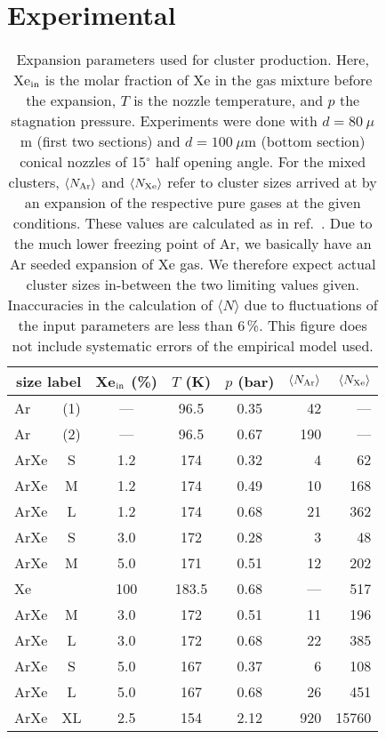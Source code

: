 \section{Experimental}
%
\begin{table*}
\caption{
Expansion parameters used for cluster production. Here, Xe$_{\rm in}$ is the molar fraction of Xe in the gas mixture before the expansion, $T$ is the nozzle temperature, and $p$ the stagnation pressure. Experiments were done with $d = 80~\mu$m (first two sections) and $d = 100~\mu$m (bottom section) conical nozzles of 15$^\circ$ half opening angle. For the mixed clusters, $\langle N_{\rm Ar} \rangle$ and $\langle N_{\rm Xe} \rangle$ refer to cluster sizes arrived at by an expansion of the respective pure gases at the given conditions. These values are calculated as in ref.\ \protect{}. Due to the much lower freezing point of Ar, we basically have an Ar seeded expansion of Xe gas. We therefore expect actual cluster sizes in-between the two limiting values given. Inaccuracies in the calculation of $\langle N\rangle$ due to fluctuations of the input parameters are less than 6\,\%. This figure does not include systematic errors of the empirical model used.
}
\label{tab:cluster}

\begin{tabular}{l c c c c r r}
%
\toprule
  \multicolumn{2}{r}{size label}  &  Xe$_{\rm in}$ (\%)  &  $T$ (K)  &  $p$ (bar) & $\langle N_{\rm Ar} \rangle$ & $\langle N_{\rm Xe} \rangle$ \\
%
\midrule
Ar & (1) & --- &  96.5  & 0.35  &  42  &  --- \\
Ar & (2) & --- &  96.5  & 0.67  & 190  &  --- \\
ArXe & S & 1.2 &  174   & 0.32  &   4  &   62 \\
ArXe & M & 1.2 &  174   & 0.49  &  10  &  168 \\
ArXe & L & 1.2 &  174   & 0.68  &  21  &  362 \\
ArXe & S & 3.0 &  172   & 0.28  &   3  &   48 \\
ArXe & M & 5.0 &  171   & 0.51  &  12  &  202 \\
Xe &  & 100 & 183.5  & 0.68  & ---  &  517 \\     
\midrule
ArXe & M & 3.0 &  172   & 0.51  &  11  &  196 \\
ArXe & L & 3.0 &  172   & 0.68  &  22  &  385 \\
ArXe & S  & 5.0 &  167   & 0.37  &   6  &  108 \\
ArXe & L  & 5.0 &  167   & 0.68  &  26  &  451 \\
\midrule
ArXe & XL & 2.5 &  154   & 2.12  &  920 & 15760\\
%
\bottomrule
\end{tabular}
\end{table*}
